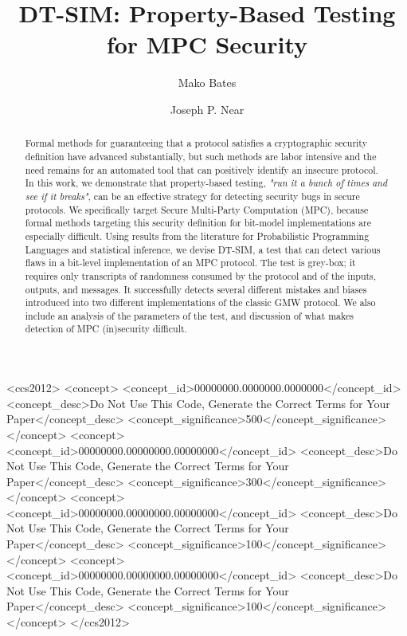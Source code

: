\documentclass[acmlarge, manuscript, screen, review, anonymous, table]{acmart}
\newcommand{\toolname}{\textsc{DT-SIM}\xspace}
\begin{document}
\title{\toolname: Property-Based Testing for MPC Security}

\author{Mako Bates}
\author{Joseph P. Near}



\newcommand{\termOfArt}[1]{\textbf{#1}}

\begin{abstract}
  Formal methods for guaranteeing that a protocol satisfies a cryptographic security definition have advanced substantially,
  but such methods are labor intensive and the need remains for an automated tool that can positively identify an insecure protocol.
  In this work, we demonstrate that property-based testing, \emph{"run it a bunch of times and see if it breaks"},
  can be an effective strategy for detecting security bugs in secure protocols.
  We specifically target Secure Multi-Party Computation (MPC), because formal methods targeting this security definition for bit-model implementations
  are especially difficult.
  Using results from the literature for Probabilistic Programming Languages and statistical inference,
  we devise \toolname, a test that can
  detect various flaws in a bit-level implementation of an MPC protocol.
  The test is grey-box; it requires only transcripts of randomness consumed by the protocol and of the inputs, outputs, and messages.
  It successfully detects several different mistakes and biases introduced into two different implementations of the classic GMW protocol.
  We also include an analysis of the parameters of the test, and discussion of what makes detection of MPC (in)security difficult.
\end{abstract}

\begin{CCSXML}
<ccs2012>
 <concept>
  <concept_id>00000000.0000000.0000000</concept_id>
  <concept_desc>Do Not Use This Code, Generate the Correct Terms for Your Paper</concept_desc>
  <concept_significance>500</concept_significance>
 </concept>
 <concept>
  <concept_id>00000000.00000000.00000000</concept_id>
  <concept_desc>Do Not Use This Code, Generate the Correct Terms for Your Paper</concept_desc>
  <concept_significance>300</concept_significance>
 </concept>
 <concept>
  <concept_id>00000000.00000000.00000000</concept_id>
  <concept_desc>Do Not Use This Code, Generate the Correct Terms for Your Paper</concept_desc>
  <concept_significance>100</concept_significance>
 </concept>
 <concept>
  <concept_id>00000000.00000000.00000000</concept_id>
  <concept_desc>Do Not Use This Code, Generate the Correct Terms for Your Paper</concept_desc>
  <concept_significance>100</concept_significance>
 </concept>
</ccs2012>
\end{CCSXML}
\end{document}

